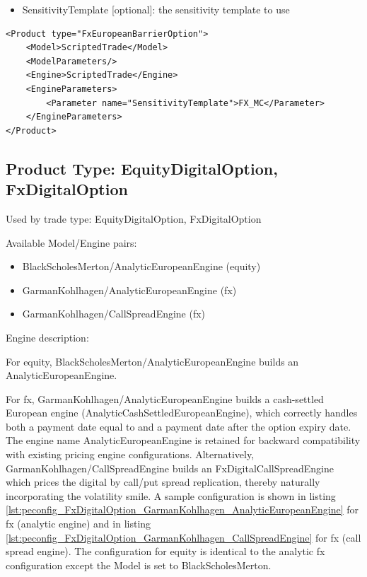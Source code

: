 \begin{itemize}
\item SensitivityTemplate [optional]: the sensitivity template to use
\end{itemize}

\begin{longlisting}
\begin{verbatim}
<Product type="FxEuropeanBarrierOption">
    <Model>ScriptedTrade</Model>
    <ModelParameters/>
    <Engine>ScriptedTrade</Engine>
    <EngineParameters>
        <Parameter name="SensitivityTemplate">FX_MC</Parameter>
    </EngineParameters>
</Product>
\end{verbatim}
\caption{Configuration for Product FxEuropeanBarrierOption, Model ScriptedTrade, Engine ScriptedTrade}
\label{lst:peconfig_FxEuropeanBarrierOption_ScriptedTrade_ScriptedTrade}
\end{longlisting}

\subsection{Product Type: EquityDigitalOption, FxDigitalOption}

Used by trade type: EquityDigitalOption, FxDigitalOption

Available Model/Engine pairs:

\begin{itemize}
\item BlackScholesMerton/AnalyticEuropeanEngine (equity)
\item GarmanKohlhagen/AnalyticEuropeanEngine (fx)
\item GarmanKohlhagen/CallSpreadEngine (fx)
\end{itemize}

Engine description:

For equity, BlackScholesMerton/AnalyticEuropeanEngine builds an AnalyticEuropeanEngine.

For fx, GarmanKohlhagen/AnalyticEuropeanEngine builds a cash-settled European engine (AnalyticCashSettledEuropeanEngine),
which correctly handles both a payment date equal to and a payment date after the option expiry date. The engine name
AnalyticEuropeanEngine is retained for backward compatibility with existing pricing engine configurations. Alternatively,
GarmanKohlhagen/CallSpreadEngine builds an FxDigitalCallSpreadEngine which prices the digital by call/put spread
replication, thereby naturally incorporating the volatility smile. A sample configuration is shown in listing
\ref{lst:peconfig_FxDigitalOption_GarmanKohlhagen_AnalyticEuropeanEngine} for fx (analytic engine) and in listing
\ref{lst:peconfig_FxDigitalOption_GarmanKohlhagen_CallSpreadEngine} for fx (call spread engine). The configuration for
equity is identical to the analytic fx configuration except the Model is set to BlackScholesMerton.

